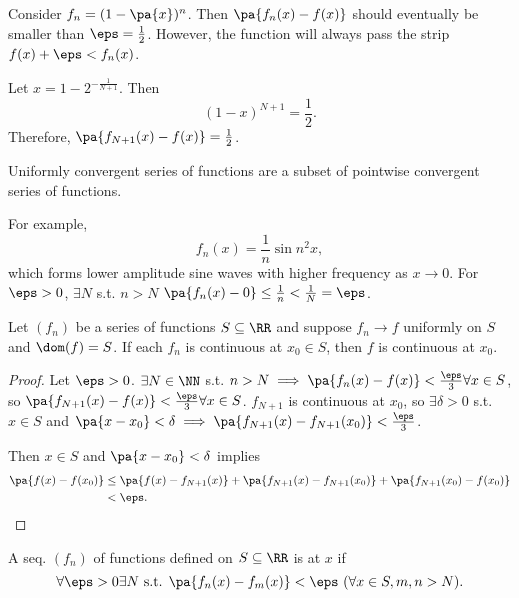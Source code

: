 \documentclass[11pt]{scrartcl}
\numberwithin{equation}{section}
\begin{document}
\begin{example}
    Consider $f_n=(1-\pa{x})^n$. Then $\pa{f_n(x)-f(x)}$ should 
    eventually be smaller than $\eps=\frac{1}{2}$. However, 
    the function will always pass the strip $f(x)+\eps<f_n(x)$.

    Let $x=1-2^{-\frac{1}{N+1}}$. Then 
    \[
        (1-x)^{N+1}=\frac{1}{2}.
    \]
    Therefore, $\pa{f_{N+1}(x)-f(x)}=\frac{1}{2}$.
\end{example}
Uniformly convergent series of functions are a subset of pointwise convergent series
of functions. 

\begin{example}
    For example, 
    \[
        f_n(x)=\frac{1}{n}\sin n^2x,
    \]
    which forms lower amplitude sine waves with higher frequency
    as $x\to 0$.
    For $\eps>0$, $\exists N$ s.t. $n>N$
    $\pa{f_n(x)-0}\leq \frac{1}{n}<\frac{1}{N}=\eps$.
\end{example}

\begin{theorem}
    Let $(f_n)$ be a series of functions $S \subseteq\RR$ and suppose 
    $f_n\to f$ uniformly on $S$ and $\dom(f)=S$.
    If each $f_n$ is continuous at $x_0\in S$, then $f$ is continuous
    at $x_0$.
\end{theorem}

\begin{proof}
    Let $\eps>0$. $\exists N\in\NN$ s.t. $n>N\implies \pa{f_n(x)-f(x)}<\frac{\eps}{3}\forall x\in S$, so $\pa{f_{N+1}(x)-f(x)}<\frac{\eps}{3}\forall x\in S$. $f_{N+1}$ is continuous at $x_0$, so 
    $\exists\delta>0$ s.t. $x\in S$ and $\pa{x-x_0}<\delta\implies
    \pa{f_{N+1}(x)-f_{N+1}(x_0)}<\frac{\eps}{3}$.

    Then $x\in S$ and $\pa{x-x_0}<\delta$ implies 
    \begin{align*}
        \pa{f(x)-f(x_0)}&\leq \pa{f(x)-f_{N+1}(x)} + \pa{f_{N+1}(x)-f_{N+1}(x_0)}  + \pa{f_{N+1}(x_0)-f(x_0)} \\
        &< \eps.\qedhere
    \end{align*}
\end{proof}

\begin{definition}
    A seq. $(f_n)$ of functions defined on $S \subseteq\RR$ is 
     at $x$ if 
    \[
        \forall \eps>0 \exists N \text{ s.t. } \pa{f_n(x)-f_m(x)}<\eps \ 
        (\forall x\in S, m,n>N).
    \]
\end{definition}
\end{document}
